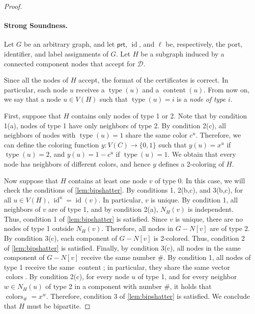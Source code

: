 \documentclass[11pt]{article}
\DeclareMathOperator{\colors}{colors}
\DeclareMathOperator{\content}{content}
\DeclareMathOperator{\id}{id}
\DeclareMathOperator{\type}{type}
\newcommand*{\ports}{\mathsf{prt}}
\begin{document}
\begin{proof}
\paragraph{Strong Soundness.} Let \( G \) be an arbitrary graph, and let \( \ports \), \( \id \), and \( \ell \) be, respectively, the port, identifier, and label assignments of \( G \). Let $H$ be a subgraph induced by a connected component nodes that accept for $\mathcal{D}$.

Since all the nodes of \( H \) accept, the format of the certificates is correct. In particular, each node \( u \) receives a \( \type(u) \) and a \( \content(u) \). From now on, we say that a node \( u \in V(H) \) such that \( \type(u) = i \) is a \emph{node of type \( i \)}.

First, suppose that \( H \) contains only nodes of type 1 or 2. Note that by condition 1(a), nodes of type 1 have only neighbors of type 2. By condition 2(c), all neighbors of nodes with \( \type(u) = 1 \) share the same color \( c^u \). Therefore, we can define the coloring function \( y: V(C) \rightarrow \{0,1\} \) such that \( y(u) = x^u \) if \( \type(u) = 2 \), and \( y(u) = 1 - c^u \) if \( \type(u) = 1 \). We obtain that every node has neighbors of different colors, and hence \( y \) defines a 2-coloring of \( H \).

Now suppose that \( H \) contains at least one node \( v \) of type 0. In this case, we will check the conditions of \cref{lem:bipshatter}. By conditions 1, 2(b,c), and 3(b,c), for all \( u \in V(H) \), \( \id^u = \id(v) \). In particular, \( v \) is unique. By condition 1, all neighbors of \( v \) are of type 1, and by condition 2(a), \( N_H(v) \) is independent. Thus, condition 1 of \cref{lem:bipshatter} is satisfied. Since \( v \) is unique, there are no nodes of type 1 outside \( N_H(v) \). Therefore, all nodes in \( G - N[v] \) are of type 2. By condition 3(c), each component of \( G - N[v] \) is 2-colored. Thus, condition 2 of \cref{lem:bipshatter} is satisfied. Finally, by condition 3(c), all nodes in the same component of \( G - N[v] \) receive the same number \( \# \). By condition 1, all nodes of type 1 receive the same \( \content \); in particular, they share the same vector \( \colors \). By condition 2(c), for every node \( u \) of type 1, and for every neighbor \( w \in N_H(u) \) of type 2 in a component with number \( \# \), it holds that \( \colors_{\#} = x^w \). Therefore, condition 3 of \cref{lem:bipshatter} is satisfied. We conclude that \( H \) must be bipartite.



\end{proof}
\end{document}
